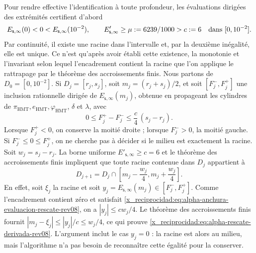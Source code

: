 Pour rendre effective l'identification à toute profondeur, les évaluations
dirigées des extrémités certifient d'abord
\[
 E_{\mathsf s,\infty}(0)<0<
 E_{\mathsf s,\infty}(10^{-2}),
 \qquad
 E'_{\mathsf s,\infty}\geq\mu:=6239/1000>c:=6
 \quad\hbox{dans }[0,10^{-2}].
\]
Par continuité, il existe une racine dans l'intervalle et, par la deuxième inégalité, elle est unique. Ce n'est qu'après avoir établi cette existence, la monotonie et l'invariant selon lequel l'encadrement contient la racine que l'on applique le rattrapage par le théorème des accroissements finis. Nous partons de \(D_0=[0,10^{-2}]\). Si \(D_j=[r_j,s_j]\), soit \(m_j=(r_j+s_j)/2\), et soit \([F_j^-,F_j^+]\) une inclusion rationnelle dirigée de \(E_{\mathsf s,\infty}(m_j)\), obtenue en propageant les cylindres de \(\pi_{\mathrm{HMT}},e_{\mathrm{HMT}},\varphi_{\mathrm{HMT}}\), \(\delta\) et \(\lambda\), avec
\begin{equation}
 0\leq F_j^+-F_j^-\leq \frac{c}{4}\,(s_j-r_j).
 \label{x_reciprocidad:eq:alpha-anchura-evaluacion-rescate-rev08}
\end{equation}
Lorsque \(F_j^+<0\), on conserve la moitié droite ;
lorsque \(F_j^->0\), la moitié gauche. Si
\(F_j^-\leq0\leq F_j^+\), on ne cherche pas à décider si le milieu est
exactement la racine. Soit \(w_j=s_j-r_j\). La borne uniforme
\(E'_{\mathsf s,\infty}\geq c=6\) et le théorème des accroissements finis impliquent que
toute racine contenue dans \(D_j\) appartient à
\begin{equation}
 D_{j+1}=D_j\cap
 \left[m_j-\frac{w_j}{4},
             m_j+\frac{w_j}{4}\right].
 \label{x_reciprocidad:eq:alpha-rescate-derivada-rev08}
\end{equation}
En effet, soit \(\xi_j\) la racine et soit
\(y_j=E_{\mathsf s,\infty}(m_j)\in[F_j^-,F_j^+]\). Comme l'encadrement contient
zéro et satisfait \eqref{x_reciprocidad:eq:alpha-anchura-evaluacion-rescate-rev08}, on a
\(|y_j|\leq cw_j/4\). Le théorème des accroissements finis fournit
\(|m_j-\xi_j|\leq |y_j|/c\leq w_j/4\), ce qui prouve
\eqref{x_reciprocidad:eq:alpha-rescate-derivada-rev08}. L'argument inclut le cas
\(y_j=0\) : la racine est alors au milieu, mais l'algorithme n'a pas
besoin de reconnaître cette égalité pour la conserver.

